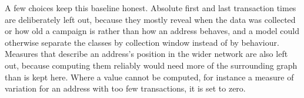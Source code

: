A few choices keep this baseline honest. Absolute first and last transaction
times are deliberately left out, because they mostly reveal when the data was
collected or how old a campaign is rather than how an address behaves, and a
model could otherwise separate the classes by collection window instead of by
behaviour. Measures that describe an address's position in the wider network are also left
out, because computing them reliably would need more of the surrounding graph
than is kept here. Where a value cannot be computed, for instance a measure of
variation for an address with too few transactions, it is set to zero.

